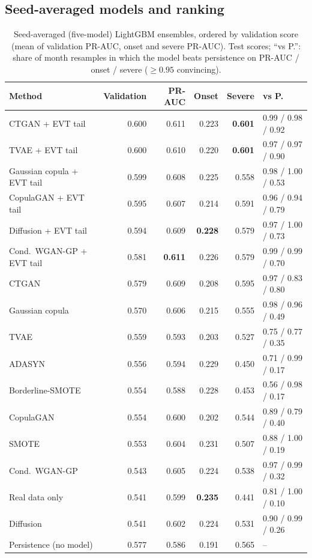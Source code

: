 \documentclass[11pt,a4paper]{article}
\begin{document}
\subsection{Seed-averaged models and ranking}
\begin{table}[H]
\centering\small
\caption{Seed-averaged (five-model) LightGBM ensembles, ordered by validation score (mean of validation
PR-AUC, onset and severe PR-AUC). Test scores; ``vs P.'': share of month resamples in which the model beats
persistence on PR-AUC / onset / severe ($\ge0.95$ convincing).}\label{tab:rank}
\begin{tabular}{@{}lrrrrl@{}}
\toprule
Method & Validation & PR-AUC & Onset & Severe & vs P.\\
\midrule
\rowcolor{orange!8} CTGAN + EVT tail & 0.600 & 0.611 & 0.223 & \textbf{0.601} & 0.99 / 0.98 / 0.92\\
\rowcolor{orange!8} TVAE + EVT tail & 0.600 & 0.610 & 0.220 & \textbf{0.601} & 0.97 / 0.97 / 0.90\\
\rowcolor{orange!8} Gaussian copula + EVT tail & 0.599 & 0.608 & 0.225 & 0.558 & 0.98 / 1.00 / 0.53\\
\rowcolor{orange!8} CopulaGAN + EVT tail & 0.595 & 0.607 & 0.214 & 0.591 & 0.96 / 0.94 / 0.79\\
\rowcolor{orange!8} Diffusion + EVT tail & 0.594 & 0.609 & \textbf{0.228} & 0.579 & 0.97 / 1.00 / 0.73\\
\rowcolor{orange!8} Cond.\ WGAN-GP + EVT tail & 0.581 & \textbf{0.611} & 0.226 & 0.579 & 0.99 / 0.99 / 0.70\\
CTGAN & 0.579 & 0.609 & 0.208 & 0.595 & 0.97 / 0.83 / 0.80\\
Gaussian copula & 0.570 & 0.606 & 0.215 & 0.555 & 0.98 / 0.96 / 0.49\\
TVAE & 0.559 & 0.593 & 0.203 & 0.527 & 0.75 / 0.77 / 0.35\\
ADASYN & 0.556 & 0.594 & 0.229 & 0.450 & 0.71 / 0.99 / 0.17\\
Borderline-SMOTE & 0.554 & 0.588 & 0.228 & 0.453 & 0.56 / 0.98 / 0.17\\
CopulaGAN & 0.554 & 0.600 & 0.202 & 0.544 & 0.89 / 0.79 / 0.40\\
SMOTE & 0.553 & 0.604 & 0.231 & 0.507 & 0.88 / 1.00 / 0.19\\
Cond.\ WGAN-GP & 0.543 & 0.605 & 0.224 & 0.538 & 0.97 / 0.99 / 0.32\\
Real data only & 0.541 & 0.599 & \textbf{0.235} & 0.441 & 0.81 / 1.00 / 0.10\\
Diffusion & 0.541 & 0.602 & 0.224 & 0.531 & 0.90 / 0.99 / 0.26\\
\midrule
Persistence (no model) & 0.577 & 0.586 & 0.191 & 0.565 & --\\
\bottomrule
\end{tabular}
\end{table}
\end{document}
